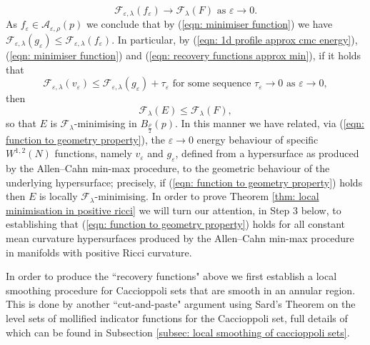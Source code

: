 \documentclass[11pt]{article}
\begin{document}
\begin{equation}\label{eqn: recovery functions approx min}
    \mathcal{F}_{\varepsilon,\lambda}(f_\varepsilon) \rightarrow \mathcal{F}_\lambda(F) \text{ as } \varepsilon \rightarrow 0.
\end{equation}
As $f_\varepsilon \in \mathcal{A}_{\varepsilon,\rho}(p)$ we conclude that by (\ref{eqn: minimiser function}) we have $\mathcal{F}_{\varepsilon,\lambda}(g_\varepsilon) \leq \mathcal{F}_{\varepsilon,\lambda}(f_\varepsilon)$. In particular, by (\ref{eqn: 1d profile approx cmc energy}), (\ref{eqn: minimiser function}) and (\ref{eqn: recovery functions approx min}), if it holds that
\begin{equation}\label{eqn: function to geometry property}
     \mathcal{F}_{\varepsilon,\lambda}(v_\varepsilon) \leq \mathcal{F}_{\varepsilon,\lambda}(g_\varepsilon) + \tau_\varepsilon \text{ for some sequence } \tau_\varepsilon \rightarrow 0 \text{ as } \varepsilon \rightarrow 0,
\end{equation}
then
\begin{equation*}
    \mathcal{F}_\lambda(E) \leq \mathcal{F}_\lambda(F),
\end{equation*}
so that $E$ is $\mathcal{F}_\lambda$-minimising in $B_{\frac{\rho}{2}}(p)$. In this manner we have related, via (\ref{eqn: function to geometry property}), the $\varepsilon \rightarrow 0$ energy behaviour of specific $W^{1,2}(N)$ functions, namely $v_\varepsilon$ and $g_\varepsilon$, defined from a hypersurface as produced by the Allen--Cahn min-max procedure, to the geometric behaviour of the underlying hypersurface; precisely, if (\ref{eqn: function to geometry property}) holds then $E$ is locally $\mathcal{F}_\lambda$-minimising. In order to prove Theorem \ref{thm: local minimisation in positive ricci} we will turn our attention, in Step 3 below, to establishing that (\ref{eqn: function to geometry property}) holds for all constant mean curvature hypersurfaces produced by the Allen--Cahn min-max procedure in manifolds with positive Ricci curvature.

\bigskip

In order to produce the “recovery functions" above we first establish a local smoothing procedure for Caccioppoli sets that are smooth in an annular region. This is done by another “cut-and-paste" argument using Sard's Theorem on the level sets of mollified indicator functions for the Caccioppoli set, full details of which can be found in Subsection \ref{subsec: local smoothing of caccioppoli sets}. 
\end{document}
